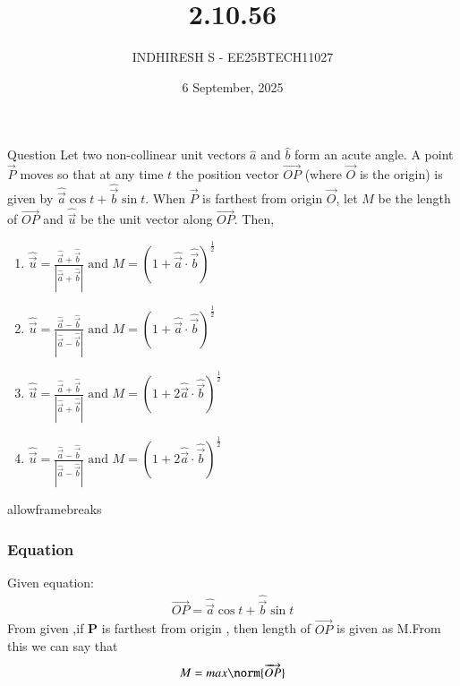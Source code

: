 \documentclass{beamer}
\title %
{2.10.56}
\date{6 September, 2025}
\author %
{INDHIRESH S - EE25BTECH11027}
\begin{document}
\frame{\titlepage}
\begin{frame}{Question}
Let two non-collinear unit vectors $\hat{a}$ and $\hat{b}$ form an acute angle. A point $\vec{P}$ moves so that at any time $t$ the position vector $\overrightarrow{OP}$ (where $\vec{O}$ is the origin) is given by $\hat{\vec{a}}\cos{t} + \hat{\vec{b}}\sin{t}$. When $\vec{P}$ is farthest from origin $\vec{O}$, let $M$ be the length of $\overrightarrow{OP}$ and $\hat{\vec{u}}$ be the unit vector along $\overrightarrow{OP}$. Then,

    \begin{enumerate}
	    \item $\hat{\vec{u}} = \frac{\hat{\vec{a}}+\hat{\vec{b}}}{|\hat{\vec{a}}+\hat{\vec{b}}|} \text{ and } M = (1+\hat{\vec{a}} \cdot \hat{\vec{b}})^{\frac{1}{2}}$
    	\item $\hat{\vec{u}} = \frac{\hat{\vec{a}}-\hat{\vec{b}}}{|\hat{\vec{a}}-\hat{\vec{b}}|} \text{ and } M = (1+\hat{\vec{a}} \cdot \hat{\vec{b}})^{\frac{1}{2}}$
    	\item $\hat{\vec{u}} = \frac{\hat{\vec{a}}+\hat{\vec{b}}}{|\hat{\vec{a}}+\hat{\vec{b}}|} \text{ and } M = (1+2\hat{\vec{a}} \cdot \hat{\vec{b}})^{\frac{1}{2}}$
    	\item $\hat{\vec{u}} = \frac{\hat{\vec{a}}-\hat{\vec{b}}}{|\hat{\vec{a}}-\hat{\vec{b}}|} \text{ and } M = (1+2\hat{\vec{a}} \cdot \hat{\vec{b}})^{\frac{1}{2}}$
    \end{enumerate}
    
\end{frame}
\begin{frame}{allowframebreaks}
\frametitle{Equation}

    \centering
    
    \label{tab:parameters}
Given equation:
\begin{align}
     \overrightarrow{OP}=\hat{\vec{a}}\cos{t} + \hat{\vec{b}}\sin{t}
\end{align}
From given ,if \textbf{P} is farthest from origin , then length of $\overrightarrow{OP}$ is given as M.From this we can say  that
\begin{align}
   M=max\norm{\overrightarrow{OP}}
\end{align}
   
\end{frame}
\end{document}
